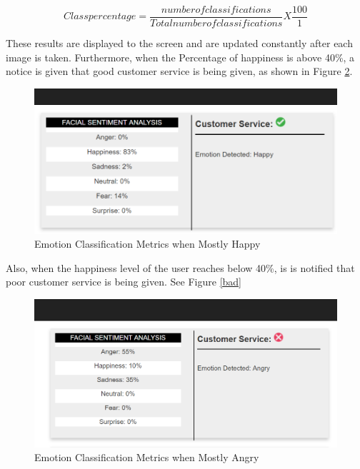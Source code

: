 \begin{equation}\label{eq:per}
Class percentage = 
\frac{
	number of classifications
}{
	Total number of classifications
}
X   
\frac{
	100
}{
	1
}
\end{equation}

These results are displayed to the screen and are updated constantly after each image is taken. Furthermore, when the Percentage of happiness is above 40\%, a notice is given that good customer service is being given, as shown in Figure \ref{good}.

\begin{figure}[ht]
	\begin{center}
		\advance\leftskip-3cm
		\advance\rightskip-3cm
		\includegraphics[keepaspectratio=true,scale=0.5]{__resources/implementation/good.png}
		\caption{Emotion Classification Metrics when Mostly Happy}
		\label{good}
	\end{center}
\end{figure}


Also, when the happiness level of the user reaches below 40\%, is is notified that poor customer service is being given. See Figure \ref{bad}

\begin{figure}[ht]
	\begin{center}
		\advance\leftskip-3cm
		\advance\rightskip-3cm
		\includegraphics[keepaspectratio=true,scale=0.5]{__resources/implementation/bad.png}
		\caption{Emotion Classification Metrics when Mostly Angry}
		\label{good}
	\end{center}
\end{figure}
\newpage

